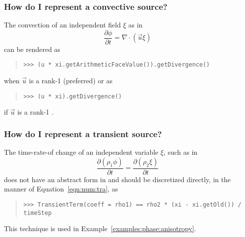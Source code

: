                 \subsubsection{How do I represent a convective source?}
                    The convection of an independent field $\xi$ as in
                    \[
                        \frac{\partial \phi}{\partial t} 
                        = \nabla\cdot
                        \left(
                            \vec{u} \xi
                        \right)
                    \]
                    can be rendered as
                    \begin{quote}
\begin{verbatim}
>>> (u * xi.getArithmeticFaceValue()).getDivergence()
\end{verbatim}
                    \end{quote}
                    when $\vec{u}$ is a rank-1  
                    (preferred) or as
                    \begin{quote}
\begin{verbatim}
>>> (u * xi).getDivergence()
\end{verbatim}
                    \end{quote}
                    if $\vec{u}$ is a rank-1 .


                \subsubsection{How do I represent a transient source?}
                    The time-rate-of change of an independent variable
                    $\xi$, such as in
                    \[
                        \frac{\partial (\rho_1 \phi)}{\partial t}
                        = \frac{\partial (\rho_2 \xi)}{\partial t}
                    \]
                    does not have an abstract form in \FiPy{} and
                    should be discretized directly, in the manner of
                    Equation~\eqref{eqn:num:tra}, as
                    \begin{quote}
\begin{verbatim}
>>> TransientTerm(coeff = rho1) == rho2 * (xi - xi.getOld()) / timeStep
\end{verbatim}
                    \end{quote}
                    This technique is used in
                    Example~\ref{examples:phase:anisotropy}.
                    
